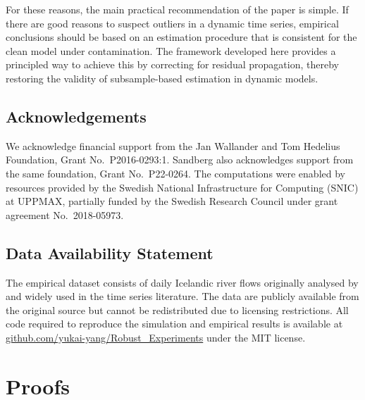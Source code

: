 \documentclass[12pt]{article}
\newif\ifanonymous
\numberwithin{equation}{section}
\begin{document}
For these reasons, the main practical recommendation of the paper is simple. 
If there are good reasons to suspect outliers in a dynamic time series, empirical conclusions should be based on an estimation procedure that is consistent for the clean model under contamination. 
The framework developed here provides a principled way to achieve this by correcting for residual propagation, thereby restoring the validity of subsample-based estimation in dynamic models.

\ifanonymous

\else
\subsection*{Acknowledgements}

We acknowledge financial support from the Jan Wallander and Tom Hedelius Foundation, Grant No.\ P2016-0293:1. 
Sandberg also acknowledges support from the same foundation, Grant No.\ P22-0264.
The computations were enabled by resources provided by the Swedish National Infrastructure for Computing (SNIC) at UPPMAX, partially funded by the Swedish Research Council under grant agreement No.\ 2018-05973.

\subsection*{Data Availability Statement}

The empirical dataset consists of daily Icelandic river flows originally analysed by \citet{ToThGu85} and widely used in the time series literature. The data are publicly available from the original source but cannot be redistributed due to licensing restrictions. All code required to reproduce the simulation and empirical results is available at \href{https://github.com/yukai-yang/Robust_Experiments}{github.com/yukai-yang/Robust\_Experiments} under the MIT license.
\fi






\appendix

\section{Proofs}
\end{document}

